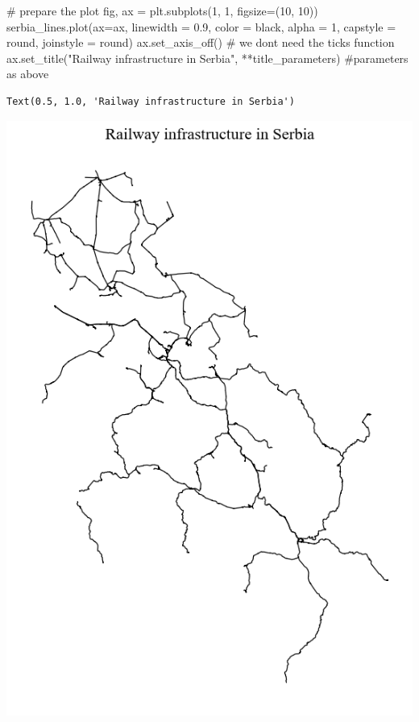 \documentclass[
  letterpaper,
  DIV=11,
  numbers=noendperiod]{scrreprt}
\newenvironment{Shaded}{\begin{snugshade}}{\end{snugshade}}
\newcommand{\CommentTok}[1]{\textcolor[rgb]{0.37,0.37,0.37}{#1}}
\newcommand{\DecValTok}[1]{\textcolor[rgb]{0.68,0.00,0.00}{#1}}
\newcommand{\FloatTok}[1]{\textcolor[rgb]{0.68,0.00,0.00}{#1}}
\newcommand{\NormalTok}[1]{\textcolor[rgb]{0.00,0.23,0.31}{#1}}
\newcommand{\OperatorTok}[1]{\textcolor[rgb]{0.37,0.37,0.37}{#1}}
\newcommand{\StringTok}[1]{\textcolor[rgb]{0.13,0.47,0.30}{#1}}
\begin{document}
\begin{Shaded}
\begin{Highlighting}[]
\CommentTok{\# prepare the plot}
\NormalTok{fig, ax }\OperatorTok{=}\NormalTok{ plt.subplots(}\DecValTok{1}\NormalTok{, }\DecValTok{1}\NormalTok{, figsize}\OperatorTok{=}\NormalTok{(}\DecValTok{10}\NormalTok{, }\DecValTok{10}\NormalTok{))}
\NormalTok{serbia\_lines.plot(ax}\OperatorTok{=}\NormalTok{ax, linewidth }\OperatorTok{=} \FloatTok{0.9}\NormalTok{, color }\OperatorTok{=} \StringTok{\textquotesingle{}black\textquotesingle{}}\NormalTok{, alpha }\OperatorTok{=} \DecValTok{1}\NormalTok{, capstyle }\OperatorTok{=} \StringTok{\textquotesingle{}round\textquotesingle{}}\NormalTok{, joinstyle }\OperatorTok{=} \StringTok{\textquotesingle{}round\textquotesingle{}}\NormalTok{)}
\NormalTok{ax.set\_axis\_off() }\CommentTok{\# we don\textquotesingle{}t need the ticks function}
\NormalTok{ax.set\_title(}\StringTok{"Railway infrastructure in Serbia"}\NormalTok{, }\OperatorTok{**}\NormalTok{title\_parameters) }\CommentTok{\#parameters as above}
\end{Highlighting}
\end{Shaded}

\begin{verbatim}
Text(0.5, 1.0, 'Railway infrastructure in Serbia')
\end{verbatim}

\includegraphics{labs/w02_maps_files/figure-pdf/cell-14-output-2.png}
\end{document}
